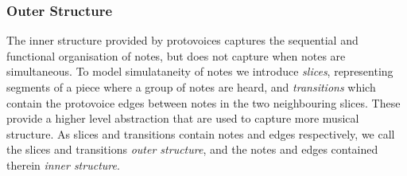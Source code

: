 \documentclass[12pt,a4paper,twoside,openright]{report}
\theoremstyle{definition}
\begin{document}
\subsubsection{Outer Structure}
\label{sub:Outer Structure}

The inner structure provided by protovoices captures the sequential and functional organisation of notes, but does not capture when notes are simultaneous. To model simulataneity of notes we introduce \textit{slices}, representing segments of a piece where a group of notes are heard, and \textit{transitions} which contain the protovoice edges between notes in the two neighbouring slices. These provide a higher level abstraction that are used to capture more musical structure. As slices and transitions contain notes and edges respectively, we call the slices and transitions \textit{outer structure}, and the notes and edges contained therein \textit{inner structure}.
\end{document}
